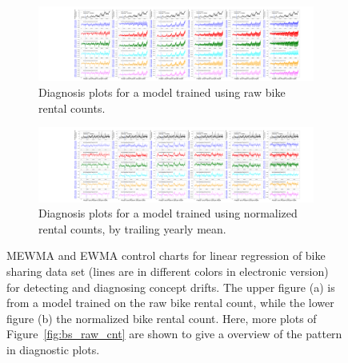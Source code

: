 \documentclass[twoside,11pt]{article}
\begin{document}
\begin{figure}[!htbp]
    \begin{subfigure}[t]{1.0\linewidth}
     \centering
         \includegraphics[width=1.0\textwidth, trim=12.5in 0.5in 3.0in 1.0in, clip]{../figures/v14/bike_sharing/reg_lin_cat_syr_10_tr_3/neg_single_bike_fisher_mlines_with_regu_1e-08_0_0001_0_01_99_99_72.png}
     \caption{Diagnosis plots for a model trained using raw bike rental counts.}
     \label{fig:bs_raw_cnt_more}
\end{subfigure}
\begin{subfigure}[t]{1.0\linewidth}
     \centering
        \includegraphics[width=1.0\textwidth, trim=12.5in 0.5in 3.0in 1.0in, clip]{../figures/v14/bike_sharing/reg_lin_cat_norm_syr_10_pow_tr_3/neg_single_bike_fisher_mlines_with_regu_1e-08_0_0001_0_01_99_99_72.png}
     \caption{Diagnosis plots for a model trained using normalized rental counts, by trailing yearly mean.}
     \label{fig:bs_norm_cnt_more}
\end{subfigure}
  \caption{
  MEWMA and EWMA control charts for linear regression of bike sharing data set (lines are in different colors in electronic version) for detecting and diagnosing concept drifts. The upper figure (a) is from a model trained on the raw bike rental count, while the lower figure (b) the normalized bike rental count. Here, more plots of Figure~\ref{fig:bs_raw_cnt} are shown to give a overview of the pattern in diagnostic plots.
}
\label{fig:bike_sharing_diag_more}
\end{figure}
\end{document}
